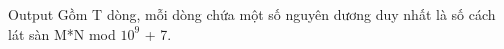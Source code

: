 Output  
Gồm T dòng, mỗi dòng chứa một số nguyên dương duy nhất là số cách lát sàn M*N mod $10^{9}$   + 7.